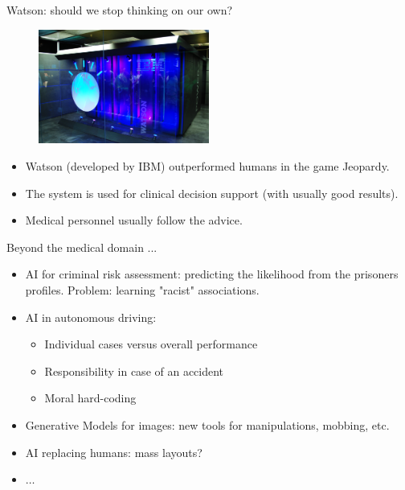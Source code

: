 \documentclass[xcolor=pdftex,dvipsnames,table]{beamer}
\begin{document}
\begin{frame}{Watson: should we stop thinking on our own?}
\begin{figure}[htb]
\includegraphics[width=0.5\textwidth]{../graphics/watson.pdf}
\end{figure}
\begin{itemize}
\item<1-> Watson (developed by IBM) outperformed humans in the game Jeopardy. 
\item<2-> The system is used for clinical decision support (with usually good results).  
\item<3-> Medical personnel usually follow the advice. 
\end{itemize}
\end{frame}

\begin{frame}{Beyond the medical domain ... }
\begin{itemize}
\item AI for criminal risk assessment: predicting the likelihood  from the prisoners profiles. Problem: learning "racist" associations.
\item AI in autonomous driving: 
\begin{itemize}
	\item Individual cases versus overall performance
	\item Responsibility in case of an accident
	\item Moral hard-coding 
\end{itemize}
\item Generative Models for images: new tools for manipulations, mobbing, etc. 
\item AI replacing humans: mass layouts? 
\item $\ldots$
\end{itemize}

\end{frame}

\end{document}
